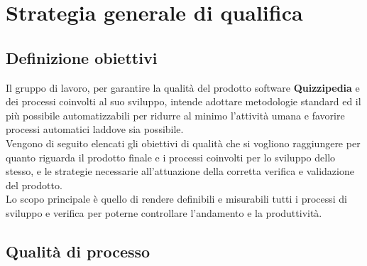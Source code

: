 \documentclass[a4paper,11pt]{article}
\begin{document}
\newpage

\section{Strategia generale di qualifica}
\subsection{Definizione obiettivi}
Il gruppo di lavoro, per garantire la qualità del prodotto software \textbf{Quizzipedia} e dei processi coinvolti al suo sviluppo, intende adottare metodologie standard ed il più possibile automatizzabili per ridurre al minimo l'attività umana e favorire processi automatici laddove sia possibile.\\
Vengono di seguito elencati gli obiettivi di qualità che si vogliono raggiungere per quanto riguarda il prodotto finale e i processi coinvolti per lo sviluppo dello stesso, e le strategie necessarie all'attuazione della corretta verifica e validazione del prodotto.\\
Lo scopo principale è quello di rendere definibili e misurabili tutti i processi di sviluppo e verifica per poterne controllare l'andamento e la produttività. 
\subsection{Qualità di processo}
\end{document}
